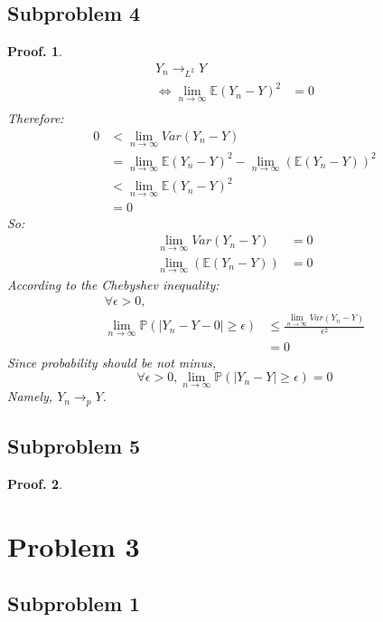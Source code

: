 \documentclass{article}
\theoremstyle{break}
\newtheorem*{proof_break}{Proof.}
\begin{document}
    \subsection{Subproblem 4}
    \begin{proof_break}
        \begin{align*}
            Y_n\to_{L^2}Y\\
            \Leftrightarrow\lim_{n\to\infty}\mathbb{E}(Y_n-Y)^2&=0\\
        \end{align*}
        Therefore:
        \begin{align*} 
            0&<\lim_{n\to\infty}Var(Y_n-Y)\\
            &=\lim_{n\to\infty}\mathbb{E}(Y_n-Y)^2-\lim_{n\to\infty}(\mathbb{E}(Y_n-Y))^2\\
            &<\lim_{n\to\infty}\mathbb{E}(Y_n-Y)^2\\
            &=0
        \end{align*}
        So:
        \begin{align*}
            \lim_{n\to\infty}Var(Y_n-Y)&=0\\
            \lim_{n\to\infty}(\mathbb{E}(Y_n-Y))&=0
        \end{align*}
        According to the Chebyshev inequality:
        \begin{align*}
            \forall \epsilon > 0,&\\
            \lim_{n\to\infty}\mathbb{P}(|Y_n-Y-0|\geq\epsilon)&\leq\frac{\lim_{n\to\infty}Var(Y_n-Y)}{\epsilon^2}\\
            &=0
        \end{align*}
        Since probability should be not minus,
        $$\forall \epsilon > 0,
        \lim_{n\to\infty}\mathbb{P}(|Y_n-Y|\geq\epsilon)=0$$
        Namely, $Y_n\to_{p}Y$.
    \end{proof_break}
    \subsection{Subproblem 5}
    \begin{proof_break}
        
    \end{proof_break}
    \section{Problem 3}
    \subsection{Subproblem 1}
\end{document}
